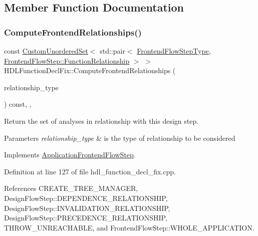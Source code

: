 \subsection{Member Function Documentation}
\mbox{\label{classHDLFunctionDeclFix_a51ce4742382debdcc01004a08bafbcae}} 
\subsubsection{\texorpdfstring{Compute\+Frontend\+Relationships()}{ComputeFrontendRelationships()}}
{\footnotesize\ttfamily const \hyperlink{classCustomUnorderedSet}{Custom\+Unordered\+Set}$<$ std\+::pair$<$ \hyperlink{frontend__flow__step_8hpp_afeb3716c693d2b2e4ed3e6d04c3b63bb}{Frontend\+Flow\+Step\+Type}, \hyperlink{classFrontendFlowStep_af7cf30f2023e5b99e637dc2058289ab0}{Frontend\+Flow\+Step\+::\+Function\+Relationship} $>$ $>$ H\+D\+L\+Function\+Decl\+Fix\+::\+Compute\+Frontend\+Relationships (\begin{DoxyParamCaption}\item[{const \hyperlink{classDesignFlowStep_a723a3baf19ff2ceb77bc13e099d0b1b7}{Design\+Flow\+Step\+::\+Relationship\+Type}}]{relationship\+\_\+type }\end{DoxyParamCaption}) const\hspace{0.3cm}{\ttfamily [override]}, {\ttfamily [protected]}, {\ttfamily [virtual]}}



Return the set of analyses in relationship with this design step. 


\begin{DoxyParams}{Parameters}
{\em relationship\+\_\+type} & is the type of relationship to be considered \\
\hline
\end{DoxyParams}


Implements \hyperlink{classApplicationFrontendFlowStep_ab308200c0096ccff3a1ff50e864ed61f}{Application\+Frontend\+Flow\+Step}.



Definition at line 127 of file hdl\+\_\+function\+\_\+decl\+\_\+fix.\+cpp.



References C\+R\+E\+A\+T\+E\+\_\+\+T\+R\+E\+E\+\_\+\+M\+A\+N\+A\+G\+ER, Design\+Flow\+Step\+::\+D\+E\+P\+E\+N\+D\+E\+N\+C\+E\+\_\+\+R\+E\+L\+A\+T\+I\+O\+N\+S\+H\+IP, Design\+Flow\+Step\+::\+I\+N\+V\+A\+L\+I\+D\+A\+T\+I\+O\+N\+\_\+\+R\+E\+L\+A\+T\+I\+O\+N\+S\+H\+IP, Design\+Flow\+Step\+::\+P\+R\+E\+C\+E\+D\+E\+N\+C\+E\+\_\+\+R\+E\+L\+A\+T\+I\+O\+N\+S\+H\+IP, T\+H\+R\+O\+W\+\_\+\+U\+N\+R\+E\+A\+C\+H\+A\+B\+LE, and Frontend\+Flow\+Step\+::\+W\+H\+O\+L\+E\+\_\+\+A\+P\+P\+L\+I\+C\+A\+T\+I\+ON.

